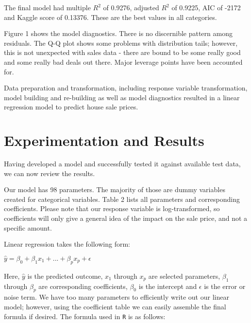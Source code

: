 \documentclass[
]{article}
\begin{document}
The final model had multiple \(R^2\) of 0.9276, adjusted \(R^2\) of
0.9225, AIC of -2172 and Kaggle score of 0.13376. These are the best
values in all categories.

Figure 1 shows the model diagnostics. There is no discernible pattern
among residuals. The Q-Q plot shows some problems with distribution
tails; however, this is not unexpected with sales data - there are bound
to be some really good and some really bad deals out there. Major
leverage points have been accounted for.

Data preparation and transformation, including response variable
transformation, model building and re-building as well as model
diagnostics resulted in a linear regression model to predict house sale
prices.

\hypertarget{experimentation-and-results}{%
\section{Experimentation and
Results}\label{experimentation-and-results}}

Having developed a model and successfully tested it against available
test data, we can now review the results.

Our model has 98 parameters. The majority of those are dummy variables
created for categorical variables. Table 2 lists all parameters and
corresponding coefficients. Please note that our response variable is
log-transformed, so coefficients will only give a general idea of the
impact on the sale price, and not a specific amount.

Linear regression takes the following form:

\begin{center}
$\hat{y} = \beta_0 + \beta_1 x_1 + ... + \beta_p x_p + \epsilon$
\end{center}

Here, \(\hat{y}\) is the predicted outcome, \(x_1\) through \(x_p\) are
selected parameters, \(\beta_1\) through \(\beta_p\) are corresponding
coefficients, \(\beta_0\) is the intercept and \(\epsilon\) is the error
or noise term. We have too many parameters to efficiently write out our
linear model; however, using the coefficient table we can easily
assemble the final formula if desired. The formula used in \texttt{R} is
as follows:
\end{document}
